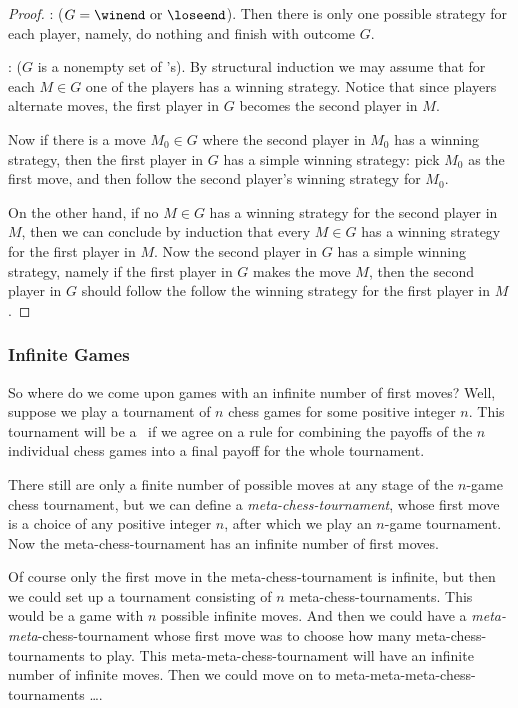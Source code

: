 \begin{definition}
\begin{proof}
: ($G = \winend\text{ or }\loseend$).  Then
there is only one possible strategy for each player, namely, do
nothing and finish with outcome $G$.

: ($G$ is a nonempty set of \wnls's).
By structural induction we may assume that for each $M \in G$ one of
the players has a winning strategy.  Notice that since players
alternate moves, the first player in $G$ becomes the second player in
$M$.

Now if there is a move $M_0 \in G$ where the second player in $M_0$ has a
winning strategy, then the first player in $G$ has a simple winning
strategy: pick $M_0$ as the first move, and then follow the second
player's winning strategy for $M_0$.

On the other hand, if no $M \in G$ has a winning strategy for the
second player in $M$, then we can conclude by induction that every $M
\in G$ has a winning strategy for the first player in $M$.  Now the
second player in $G$ has a simple winning strategy, namely if the first
player in $G$ makes the move $M$, then the second player in $G$ should
follow the follow the winning strategy for the first player in $M$.
\end{proof}

\subsubsection{Infinite Games}
So where do we come upon games with an infinite number of first
moves?  Well, suppose we play a tournament of $n$ chess games for some
positive integer $n$.  This tournament will be a \wnls\ if we agree on a
rule for combining the payoffs of the $n$ individual chess games into
a final payoff for the whole tournament.

There still are only a finite number of possible moves at any stage of
the $n$-game chess tournament, but we can define a
\emph{meta-chess-tournament}, whose first move is a choice of any
positive integer $n$, after which we play an $n$-game tournament.  Now
the meta-chess-tournament has an infinite number of first moves.

Of course only the first move in the meta-chess-tournament is
infinite, but then we could set up a tournament consisting of $n$
meta-chess-tournaments.  This would be a game with $n$ possible
infinite moves.  And then we could have a
\emph{meta-meta}-chess-tournament whose first move was to choose how
many meta-chess-tournaments to play.  This meta-meta-chess-tournament
will have an infinite number of infinite moves.  Then we could move on
to meta-meta-meta-chess-tournaments \dots.


\end{definition}

